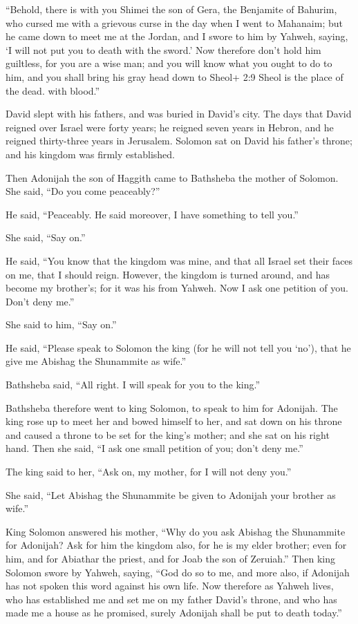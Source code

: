  ``Behold, there is with you Shimei the son of Gera, the
Benjamite of Bahurim, who cursed me with a grievous curse in the day
when I went to Mahanaim; but he came down to meet me at the Jordan, and
I swore to him by Yahweh, saying, `I will not put you to death with the
sword.'  Now therefore don't hold him guiltless, for you are
a wise man; and you will know what you ought to do to him, and you shall
bring his gray head down to Sheol+ 2:9 Sheol is the place of the dead.
with blood.''

 David slept with his fathers, and was buried in David's
city.  The days that David reigned over Israel were forty
years; he reigned seven years in Hebron, and he reigned thirty-three
years in Jerusalem.  Solomon sat on David his father's
throne; and his kingdom was firmly established.

 Then Adonijah the son of Haggith came to Bathsheba the
mother of Solomon. She said, ``Do you come peaceably?''

He said, ``Peaceably.  He said moreover, I have something
to tell you.''

She said, ``Say on.''

 He said, ``You know that the kingdom was mine, and that
all Israel set their faces on me, that I should reign. However, the
kingdom is turned around, and has become my brother's; for it was his
from Yahweh.  Now I ask one petition of you. Don't deny
me.''

She said to him, ``Say on.''

 He said, ``Please speak to Solomon the king (for he will
not tell you `no'), that he give me Abishag the Shunammite as wife.''

 Bathsheba said, ``All right. I will speak for you to the
king.''

 Bathsheba therefore went to king Solomon, to speak to him
for Adonijah. The king rose up to meet her and bowed himself to her, and
sat down on his throne and caused a throne to be set for the king's
mother; and she sat on his right hand.  Then she said, ``I
ask one small petition of you; don't deny me.''

The king said to her, ``Ask on, my mother, for I will not deny you.''

 She said, ``Let Abishag the Shunammite be given to
Adonijah your brother as wife.''

 King Solomon answered his mother, ``Why do you ask Abishag
the Shunammite for Adonijah? Ask for him the kingdom also, for he is my
elder brother; even for him, and for Abiathar the priest, and for Joab
the son of Zeruiah.''  Then king Solomon swore by Yahweh,
saying, ``God do so to me, and more also, if Adonijah has not spoken
this word against his own life.  Now therefore as Yahweh
lives, who has established me and set me on my father David's throne,
and who has made me a house as he promised, surely Adonijah shall be put
to death today.''

